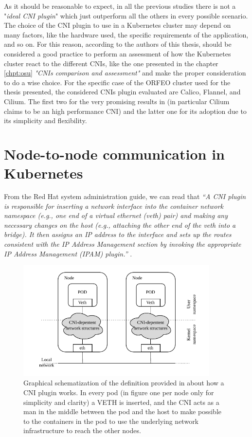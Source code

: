 As it should be reasonable to expect, in all the previous studies there is not a
"\textit{ideal CNI plugin}" which just outperform all the others in every
possible scenario. The choice of the CNI plugin to use in a Kubernetes cluster
may depend on many factors, like the hardware used, the specific requirements of
the application, and so on. For this reason, according to the authors of this
thesis, should be considered a good practice to perform an assessment of how the
Kubernetes cluster react to the different CNIs, like the one presented in the
chapter \ref{chpt:osu} \textit{"CNIs comparison and assessment"} and make the
proper consideration to do a wise choice.
For the specific case of the ORFEO cluster used for the thesis presented, the
considered CNIs plugin evaluated are Calico, Flannel, and Cilium. The first two
for the very promising results in \cite{Koukis2024} (in particular Cilium claims
to be an high performance CNI) and the latter one for its adoption due to its
simplicity and flexibility.

\section{Node-to-node communication in Kubernetes}\label{sec:node2node}

From the Red Hat system administration guide, we can read that
\textit{``A CNI plugin is responsible for inserting a network interface into the
    container network namespace (e.g., one end of a virtual ethernet (veth)
    pair) and making any necessary changes on the host (e.g., attaching the
    other end of the veth into a bridge). It then assigns an IP address to the
    interface and sets up the routes consistent with the IP Address Management
    section by invoking the appropriate IP Address Management (IPAM) plugin.''
} \cite{redhat-cni}.


\begin{figure}[H]
  \centering
  \includegraphics[width=0.9\textwidth]{img/chpt2/CNI-generic}
  \caption{Graphical schematization of the definition provided in
    \cite{redhat-cni} about how a CNI plugin works. In every pod (in figure one
    per node only for simplicity and clarity) a VETH is inserted, and the CNI
    acts as a man in the middle between the pod and the host to make possible to
    the containers in the pod to use the underlying network infrastructure to
    reach the other nodes.}
  \label{fig:cni-generic}
\end{figure}


